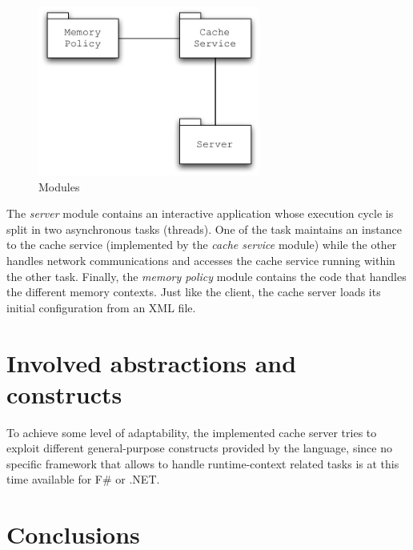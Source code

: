 \documentclass[11pt,a4paper]{article}
\begin{document}
\begin{figure}
\begin{center}
\includegraphics[width=0.65\textwidth]{figures/Server-Modules.pdf}
\caption{Modules}
\label{figure:server-modules}
\end{center}
\end{figure}

The \textit{server} module contains an interactive application whose execution cycle is split in two asynchronous tasks (threads). One of the task maintains an instance to the cache service (implemented by the \textit{cache service} module) while the other handles network communications and accesses the cache service running within the other task. Finally, the \textit{memory policy} module contains the code that handles the different memory contexts. Just like the client, the cache server loads its initial configuration from an XML file.

\section{Involved abstractions and constructs}
\label{section:functionalities}

To achieve some level of adaptability, the implemented cache server tries to exploit different general-purpose constructs provided by the language, since no specific framework that allows to handle runtime-context related tasks is at this time available for F\# or .NET.   

\section{Conclusions}
\label{section:conclusions}
\end{document}
